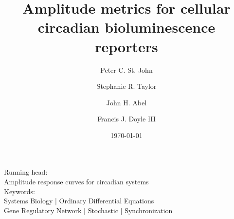 \documentclass[11pt, letterpaper]{article}
\begin{document}
\title{Amplitude metrics for cellular \\ circadian bioluminescence reporters}
\author[1]{Peter C. St. John}
\author[2]{Stephanie R. Taylor}
\author[1]{John H. Abel}
\author[1,*]{Francis J. Doyle III}
\date{\today}
\maketitle

\begin{center}
Running head:\\ {Amplitude response curves for circadian systems} \\[1ex]
Keywords:\\ Systems Biology | Ordinary Differential Equations \\ Gene
Regulatory Network | Stochastic | Synchronization
\end{center}
\end{document}

